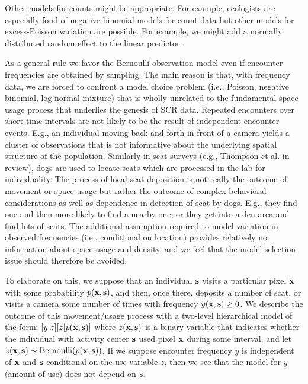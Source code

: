 Other models for counts might be appropriate. For example, ecologists
are especially fond of negative binomial models for count data
\citep{verhoef_boveng:2007,white_bennetts:1996,kery_etal:2005}
but other models for excess-Poisson variation are possible. For
example, we might add a normally distributed random effect to
the linear predictor \citep{coull_agresti:1999}.

As a general rule we favor the Bernoulli observation model even if
encounter frequencies are obtained by sampling.  The main reason is
that, with frequency data, we are forced to confront a model choice
problem (i.e., Poisson, negative binomial, log-normal mixture) that is
wholly unrelated to the fundamental space usage process that underlies
the genesis of SCR data. Repeated encounters over short time intervals
are not likely to be the result of independent encounter
events. E.g., an individual moving back and forth in front of a
camera yields a cluster of observations that is not informative about
the underlying spatial structure of the population. Similarly in scat surveys (e.g.,
Thompson et al. in review), dogs are used to locate scats which are
processed in the lab for individuality.  The process of local scat
deposition is not really the outcome of movement or space usage but rather the
outcome of complex behavioral considerations as well as dependence in
detection of scat by dogs. E.g., they find one and then more likely to
find a nearby one, or they get into a den area and find lots of scats.
The additional  assumption required to model variation in
observed frequencies (i.e., conditional on location) provides
relatively no information about space usage and density, and we feel that the
model selection issue should therefore be avoided.

To elaborate on this, we suppose that an individual ${\bf s}$ visits a
particular pixel ${\bf x}$ with some probability $p({\bf x}, {\bf
  s})$, and then, once there, deposits a number of scat, or visits
a camera some number of times with frequency $y({\bf x},{\bf s}) \ge
0$.  We describe the outcome of this movement/usage process with a two-level
hierarchical model of the form: $[y|z][z|p({\bf x},{\bf s})]$ where 
$z({\bf x},{\bf s})$ is a binary variable that indicates whether the
individual with activity center ${\bf s}$ used pixel ${\bf x}$
during some interval, and let $z({\bf x},{\bf s}) \sim
\mbox{Bernoulli}(p({\bf x},{\bf s}))$. If we suppose  encounter frequency
$y$ is independent of ${\bf x}$ and ${\bf s}$ conditional on the
use variable  $z$, then  we see that 
the model for $y$ (amount of use) does not depend on ${\bf s}$. 




